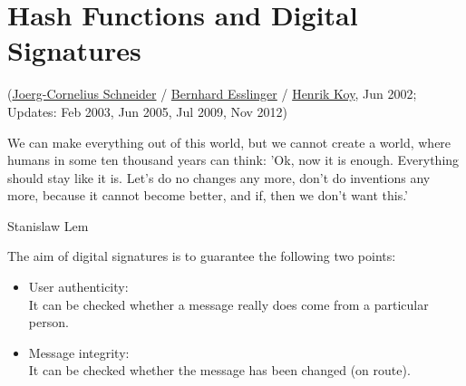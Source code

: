 
\begin{bibunit}[babalpha] %

\newpage
\hypertarget{Chapter_Hashes-and-Digital-Signatures}{}
\chapter{Hash Functions and Digital Signatures}
\label{Chapter_Hashes-and-Digital-Signatures}
(\hyperlink{author_Joerg-Cornelius-Schneider}{Joerg-Cornelius Schneider} /
 \hyperlink{author_Bernhard-Esslinger}{Bernhard Esslinger} /
 \hyperlink{author_Henrik-Koy}{Henrik Koy},
 Jun 2002;
 Updates: Feb 2003, Jun 2005, Jul 2009, Nov 2012)
\begin{ctsquote}
We can make everything out of this world, but we cannot create a world,
where humans in some ten thousand years can think: 'Ok, now it is enough.
Everything should stay like it is. Let's do no changes any more, don't do
inventions any more, because it cannot become better, and if, then we
don't want this.'
\caption[Stanislaw Lem]{Stanislaw Lem\footnotemark}
\end{ctsquote}
\addtocounter{footnote}{0}


\noindent The aim of digital signatures is to guarantee the following two points:
\begin{itemize}
 \item User authenticity: \\
      It can be checked whether a message really does
come from a particular person.
 \item Message integrity:  \\
      It can be checked whether the message has been
changed (on route).
\end{itemize}



\end{bibunit}
